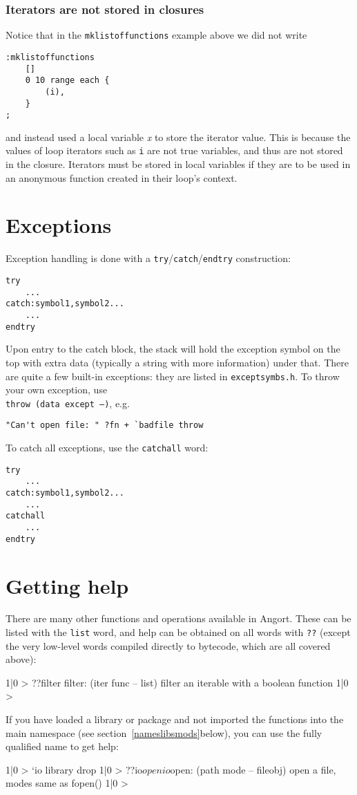 \subsubsection{Iterators are not stored in closures}
Notice that in the \texttt{mklistoffunctions} example above we did not write
\begin{lstlisting}
:mklistoffunctions
    []
    0 10 range each {
        (i),
    }
;
\end{lstlisting}
and instead used a local variable \emph{x} to store the iterator value. This is because
the values of loop iterators such as \texttt{i} are not true variables, and thus are not
stored in the closure. Iterators must be stored in local variables if they are to be used
in an anonymous function created in their loop's context.

\section{Exceptions}
Exception handling is done with a \texttt{try}/\texttt{catch}/\texttt{endtry} 
construction:
\begin{lstlisting}
try
    ...
catch:symbol1,symbol2...
    ...
endtry
\end{lstlisting}
Upon entry to the catch block, the stack will hold the exception symbol
on the top with extra data (typically a string with more information)
under that. There are quite a few built-in exceptions: they are listed
in \texttt{exceptsymbs.h}. To throw your own exception, use \\
\texttt{throw (data except --)}, e.g.
\begin{lstlisting}
"Can't open file: " ?fn + `badfile throw 
\end{lstlisting}
To catch all exceptions, use the \texttt{catchall} word:
\begin{lstlisting}
try
    ...
catch:symbol1,symbol2...
    ...
catchall
    ...
endtry
\end{lstlisting}





\section{Getting help}
There are many other functions and operations available in Angort.
These can be listed with the \texttt{list} word, and help can
be obtained on all words with \texttt{??} (except the very low-level words compiled
directly to bytecode, which are all covered above):
\begin{v}
1|0 > ??filter
filter: (iter func -- list) filter an iterable with a boolean function
1|0 > 
\end{v}
If you have loaded a library or package and not imported the functions
into the main namespace (see section~\ref{nameslibsmods}below), you
can use the fully qualified name to get help:
\begin{v}
1|0 > `io library drop
1|0 > ??io$open
io$open: (path mode -- fileobj) open a file, modes same as fopen()
1|0 > 
\end{v}

